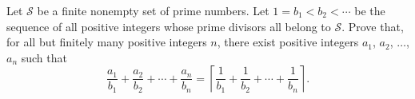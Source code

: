 Let $\mathcal{S}$ be a finite nonempty set of prime numbers. Let $1 = b_1 < b_2 < \cdots$ be the sequence of all positive integers whose prime divisors all belong to $\mathcal{S}$. Prove that, for all but finitely many positive integers $n$, there exist positive integers $a_1$, $a_2$, $\ldots$, $a_n$ such that
\[
\frac{a_1}{b_1} + \frac{a_2}{b_2} + \cdots + \frac{a_n}{b_n} = \left\lceil \frac{1}{b_1} + \frac{1}{b_2} + \cdots + \frac{1}{b_n} \right\rceil.
\]
